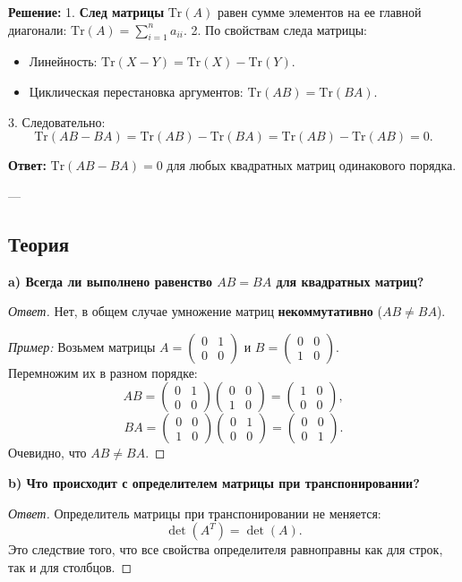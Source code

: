 \documentclass[11pt, a4paper]{article}
\begin{document}
\textbf{Решение:}
1. \textbf{След матрицы} $\text{Tr}(A)$ равен сумме элементов на ее главной диагонали: $\text{Tr}(A) = \sum_{i=1}^n a_{ii}$.
2. По свойствам следа матрицы:
   \begin{itemize}
   \item Линейность: $\text{Tr}(X - Y) = \text{Tr}(X) - \text{Tr}(Y)$.
   \item Циклическая перестановка аргументов: $\text{Tr}(AB) = \text{Tr}(BA)$.
   \end{itemize}
3. Следовательно:
$$ \text{Tr}(AB - BA) = \text{Tr}(AB) - \text{Tr}(BA) = \text{Tr}(AB) - \text{Tr}(AB) = 0. $$

\textbf{Ответ:} $\text{Tr}(AB - BA) = 0$ для любых квадратных матриц одинакового порядка.

---

\subsection*{Теория}

\textbf{a) Всегда ли выполнено равенство $AB = BA$ для квадратных матриц?}
\begin{proof}[Ответ]
Нет, в общем случае умножение матриц \textbf{некоммутативно} ($AB \ne BA$). 

\textit{Пример:} Возьмем матрицы $A = \begin{pmatrix} 0 & 1 \\ 0 & 0 \end{pmatrix}$ и $B = \begin{pmatrix} 0 & 0 \\ 1 & 0 \end{pmatrix}$. \\
Перемножим их в разном порядке:
$$ AB = \begin{pmatrix} 0 & 1 \\ 0 & 0 \end{pmatrix} \begin{pmatrix} 0 & 0 \\ 1 & 0 \end{pmatrix} = \begin{pmatrix} 1 & 0 \\ 0 & 0 \end{pmatrix}, $$
$$ BA = \begin{pmatrix} 0 & 0 \\ 1 & 0 \end{pmatrix} \begin{pmatrix} 0 & 1 \\ 0 & 0 \end{pmatrix} = \begin{pmatrix} 0 & 0 \\ 0 & 1 \end{pmatrix}. $$
Очевидно, что $AB \ne BA$.
\end{proof}

\textbf{b) Что происходит с определителем матрицы при транспонировании?}
\begin{proof}[Ответ]
Определитель матрицы при транспонировании не меняется:
$$ \det(A^T) = \det(A). $$
Это следствие того, что все свойства определителя равноправны как для строк, так и для столбцов.
\end{proof}
\end{document}
